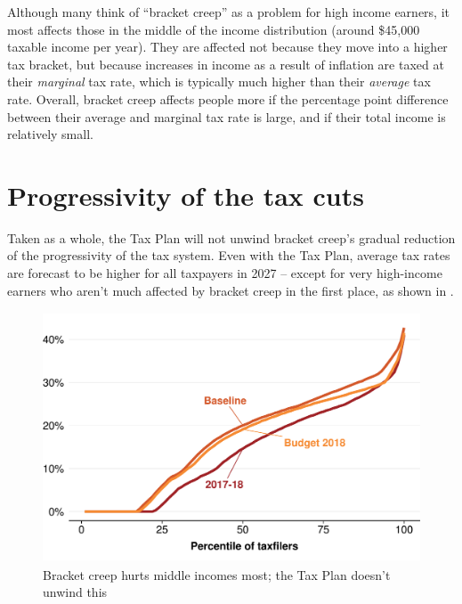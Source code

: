 \documentclass[submission]{grattan}\usepackage[]{graphicx}\usepackage[]{color}
\newenvironment{knitrout}{}{} %
\begin{document}
Although many think of ``bracket creep'' as a problem for high income earners, it most affects those in the middle of the income distribution (around \$45,000 taxable income per year). They are affected not because they move into a higher tax bracket, but because increases in income as a result of inflation are taxed at their \emph{marginal} tax rate, which is typically much higher than their \emph{average} tax rate. Overall, bracket creep affects people more if the percentage point difference between their average and marginal tax rate is large, and if their total income is relatively small.


\section{Progressivity of the tax cuts}\label{sec:progressivity-of-the-tax-cuts}

Taken as a whole, the Tax Plan will not unwind bracket creep's gradual reduction of the progressivity of the tax system. Even with the Tax Plan, average tax rates are forecast to be higher for all taxpayers in 2027 -- except for very high-income earners who aren't much affected by bracket creep in the first place, as shown in .

\begin{figure}
\caption{Bracket creep hurts middle incomes most; the Tax Plan doesn't unwind this}\label{fig:bracket-creep-hurts-middle-incomes-most}
\begin{knitrout}
\color{fgcolor}
\includegraphics[width=4.47222in,height=2.92631723826715in]{atlas/fig2-1} 

\end{knitrout}

\end{figure}
\end{document}
